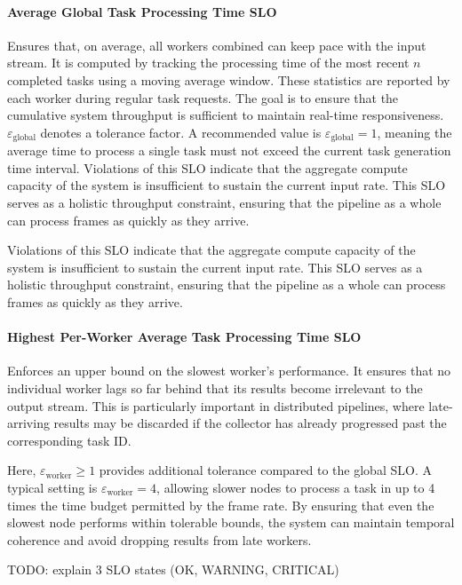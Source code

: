 \paragraph{Average Global Task Processing Time SLO} Ensures that, on average, all workers combined can keep pace with the input stream. It is computed by tracking the processing time of the most recent \(n\) completed tasks using a moving average window. These statistics are reported by each worker during regular task requests. The goal is to ensure that the cumulative system throughput is sufficient to maintain real-time responsiveness. \(\varepsilon_\text{global}\) denotes a tolerance factor. A recommended value is \(\varepsilon_\text{global} = 1\), meaning the average time to process a single task must not exceed the current task generation time interval. Violations of this SLO indicate that the aggregate compute capacity of the system is insufficient to sustain the current input rate. This SLO serves as a holistic throughput constraint, ensuring that the pipeline as a whole can process frames as quickly as they arrive.

Violations of this SLO indicate that the aggregate compute capacity of the system is insufficient to sustain the current input rate. This SLO serves as a holistic throughput constraint, ensuring that the pipeline as a whole can process frames as quickly as they arrive.

\paragraph{Highest Per-Worker Average Task Processing Time SLO} Enforces an upper bound on the slowest worker’s performance. It ensures that no individual worker lags so far behind that its results become irrelevant to the output stream. This is particularly important in distributed pipelines, where late-arriving results may be discarded if the collector has already progressed past the corresponding task ID.

Here, \(\varepsilon_\text{worker} \geq 1\) provides additional tolerance compared to the global SLO. A typical setting is \(\varepsilon_\text{worker} = 4\), allowing slower nodes to process a task in up to 4 times the time budget permitted by the frame rate. By ensuring that even the slowest node performs within tolerable bounds, the system can maintain temporal coherence and avoid dropping results from late workers.

TODO: explain 3 SLO states (OK, WARNING, CRITICAL)


